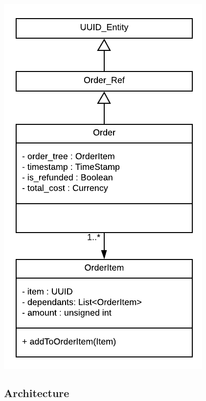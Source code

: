 	\begin{minipage}[t][][b]{.3\linewidth}
		\includegraphics[width=\linewidth]{images/data_model/order.png}
	\end{minipage}

\pagebreak

\subsection{Architecture} \label{subsec:Architecture}
